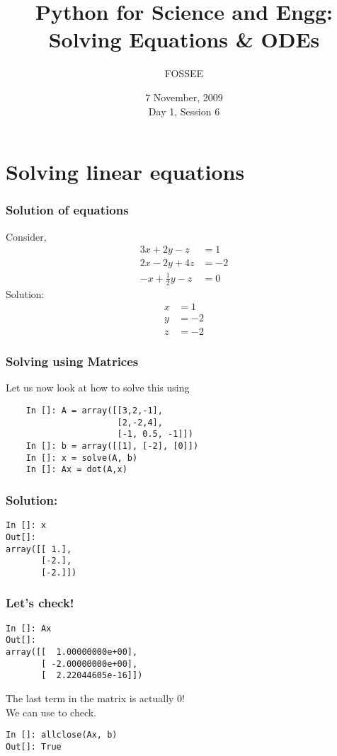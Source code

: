 \documentclass[14pt,compress]{beamer}
\title[Solving Equations \& ODEs]{Python for Science and Engg:\\Solving Equations \& ODEs}
\author[FOSSEE] {FOSSEE}
\institute[IIT Bombay] {Department of Aerospace Engineering\\IIT Bombay}
\date[] {7 November, 2009\\Day 1, Session 6}
\newcounter{time}
\newcommand{\inctime}[1]{\addtocounter{time}{#1}{\tiny \thetime\ m}}
\newcommand{\kwrd}[1]{ \texttt{\textbf{\color{blue}{#1}}}  }
\begin{document}
\begin{frame}
  \maketitle
\end{frame}


\section{Solving linear equations}

\begin{frame}[fragile]
\frametitle{Solution of equations}
Consider,
  \begin{align*}
    3x + 2y - z  & = 1 \\
    2x - 2y + 4z  & = -2 \\
    -x + \frac{1}{2}y -z & = 0
  \end{align*}
Solution:
  \begin{align*}
    x & = 1 \\
    y & = -2 \\
    z & = -2
  \end{align*}
\end{frame}

\begin{frame}[fragile]
\frametitle{Solving using Matrices}
Let us now look at how to solve this using \kwrd{matrices}
  \begin{lstlisting}
    In []: A = array([[3,2,-1],
                      [2,-2,4],                   
                      [-1, 0.5, -1]])
    In []: b = array([[1], [-2], [0]])
    In []: x = solve(A, b)
    In []: Ax = dot(A,x)
  \end{lstlisting}
\end{frame}

\begin{frame}[fragile]
\frametitle{Solution:}
\begin{lstlisting}
In []: x
Out[]: 
array([[ 1.],
       [-2.],
       [-2.]])
\end{lstlisting}
\end{frame}

\begin{frame}[fragile]
\frametitle{Let's check!}
\begin{lstlisting}
In []: Ax
Out[]: 
array([[  1.00000000e+00],
       [ -2.00000000e+00],
       [  2.22044605e-16]])
\end{lstlisting}
\begin{block}{}
The last term in the matrix is actually \alert{0}!\\
We can use \kwrd{allclose()} to check.
\end{block}
\begin{lstlisting}
In []: allclose(Ax, b)
Out[]: True
\end{lstlisting}
\inctime{15}
\end{frame}
\end{document}
